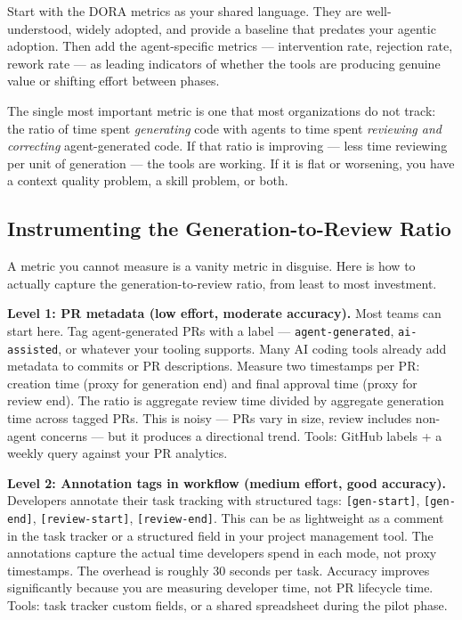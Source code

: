 \documentclass[
  a4paper,
  DIV=11,
  numbers=noendperiod]{scrreprt}
\begin{document}
Start with the DORA metrics as your shared language. They are
well-understood, widely adopted, and provide a baseline that predates
your agentic adoption. Then add the agent-specific metrics ---
intervention rate, rejection rate, rework rate --- as leading indicators
of whether the tools are producing genuine value or shifting effort
between phases.

The single most important metric is one that most organizations do not
track: the ratio of time spent \emph{generating} code with agents to
time spent \emph{reviewing and correcting} agent-generated code. If that
ratio is improving --- less time reviewing per unit of generation ---
the tools are working. If it is flat or worsening, you have a context
quality problem, a skill problem, or both.

\subsection{Instrumenting the Generation-to-Review
Ratio}\label{instrumenting-the-generation-to-review-ratio}

A metric you cannot measure is a vanity metric in disguise. Here is how
to actually capture the generation-to-review ratio, from least to most
investment.

\textbf{Level 1: PR metadata (low effort, moderate accuracy).} Most
teams can start here. Tag agent-generated PRs with a label ---
\texttt{agent-generated}, \texttt{ai-assisted}, or whatever your tooling
supports. Many AI coding tools already add metadata to commits or PR
descriptions. Measure two timestamps per PR: creation time (proxy for
generation end) and final approval time (proxy for review end). The
ratio is aggregate review time divided by aggregate generation time
across tagged PRs. This is noisy --- PRs vary in size, review includes
non-agent concerns --- but it produces a directional trend. Tools:
GitHub labels + a weekly query against your PR analytics.

\textbf{Level 2: Annotation tags in workflow (medium effort, good
accuracy).} Developers annotate their task tracking with structured
tags: \texttt{{[}gen-start{]}}, \texttt{{[}gen-end{]}},
\texttt{{[}review-start{]}}, \texttt{{[}review-end{]}}. This can be as
lightweight as a comment in the task tracker or a structured field in
your project management tool. The annotations capture the actual time
developers spend in each mode, not proxy timestamps. The overhead is
roughly 30 seconds per task. Accuracy improves significantly because you
are measuring developer time, not PR lifecycle time. Tools: task tracker
custom fields, or a shared spreadsheet during the pilot phase.
\end{document}
